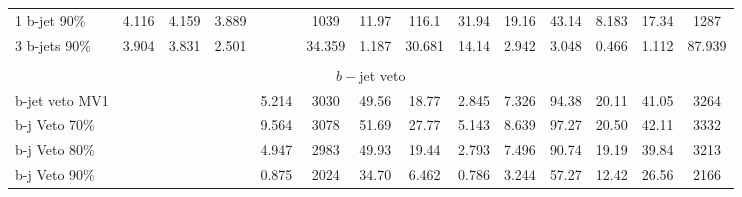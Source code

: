 \begin{table}
\begin{center}
{\begin{tabular}{l||cccc||cc|ccc|ccc||c }
            1 b-jet 90\%  &        4.116 &        4.159 &        3.889 &              &     1039     &       11.97  &      116.1   &       31.94  &       19.16  &       43.14  &        8.183 &       17.34  &     1287        \\        
            3 b-jets 90\% &        3.904 &        3.831 &        2.501 &              &       34.359 &        1.187 &       30.681 &       14.14  &        2.942 &        3.048 &        0.466 &        1.112 &       87.939    \\\hline\hline       
            \\
            \multicolumn{14}{c}{ $b-$jet veto} \\ \hline                                        
            b-jet veto MV1 &             &              &              &        5.214 &     3030     &       49.56  &       18.77  &        2.845 &        7.326 &       94.38  &       20.11  &       41.05  &     3264        \\       
            b-j Veto 70\% &              &              &              &        9.564 &     3078     &       51.69  &       27.77  &        5.143 &        8.639 &       97.27  &       20.50  &       42.11  &     3332        \\       
            b-j Veto 80\% &              &              &              &        4.947 &     2983     &       49.93  &       19.44  &        2.793 &        7.496 &       90.74  &       19.19  &       39.84  &     3213        \\       
            b-j Veto 90\% &              &              &              &        0.875 &     2024     &       34.70  &        6.462 &        0.786 &        3.244 &       57.27  &       12.42  &       26.56  &     2166        \\\hline                   
       \end{tabular}
}
\end{center}
\end{table}


